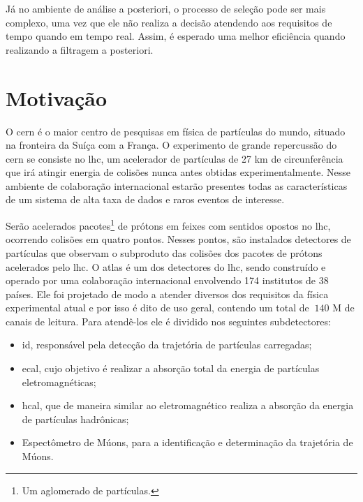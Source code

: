 Já no ambiente de análise a posteriori, o processo de seleção pode ser mais
complexo, uma vez que ele não realiza a decisão atendendo aos
requisitos de tempo quando em tempo real. Assim, é esperado 
uma melhor eficiência quando realizando a filtragem a posteriori.

\section{Motivação} 

O \gls{cern} é o maior centro de
pesquisas em física de partículas do mundo, situado na fronteira da Suíça com a
França. O experimento de grande repercussão do \gls{cern} se
consiste no \gls{lhc}, um acelerador de partículas de 27 km de
circunferência que irá atingir energia de colisões nunca antes obtidas
experimentalmente. 
Nesse ambiente de colaboração internacional estarão presentes
todas as características de um sistema de alta taxa de dados e raros eventos de
interesse.

Serão acelerados pacotes\footnote{Um aglomerado de partículas.} de prótons em
feixes com sentidos opostos no \gls{lhc},
ocorrendo colisões em quatro pontos. Nesses pontos, são instalados 
detectores de partículas que observam o subproduto das colisões dos pacotes de prótons 
acelerados pelo \gls{lhc}. O \gls{atlas} é um dos detectores do
\gls{lhc}, sendo construído e operado por uma colaboração internacional envolvendo 174 institutos de 38
países. Ele foi projetado de modo a atender diversos dos requisitos da física 
experimental atual e por isso é dito de uso geral, contendo um total de $~140$ M 
de canais de leitura. Para atendê-los ele é dividido nos seguintes subdetectores:


\begin{itemize}
\item \gls{id}, responsável pela detecção da trajetória de partículas carregadas;
\item \gls{ecal}, cujo objetivo é realizar a absorção total da
energia de partículas eletromagnéticas;
\item \gls{hcal}, que de maneira similar ao eletromagnético realiza a
absorção da energia de partículas hadrônicas;
\item Espectômetro de Múons, para a identificação e determinação da trajetória de
Múons.
\end{itemize}

